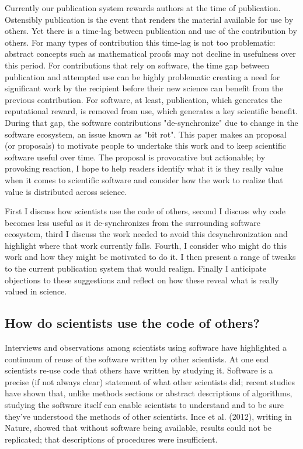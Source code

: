 \documentclass{sigchi}
\begin{document}
Currently our publication system rewards authors at the time of publication. Ostensibly publication is the event that renders the material available for use by others. Yet there is a time-lag between publication and use of the contribution by others. For many types of contribution this time-lag is not too problematic: abstract concepts such as mathematical proofs may not decline in usefulness over this period. For contributions that rely on software, the time gap between publication and attempted use can be highly problematic creating a need for significant work by the recipient before their new science can benefit from the previous contribution. For software, at least, publication, which generates the reputational reward, is removed from use, which generates a key scientific benefit. During that gap, the software contributions "de-synchronize" due to change in the software ecosystem, an issue known as "bit rot". This paper makes an proposal (or proposals) to motivate people to undertake this work and to keep scientific software useful over time. The proposal is provocative but actionable; by provoking reaction, I hope to help readers identify what it is they really value when it comes to scientific software and consider how the work to realize that value is distributed across science.

First I discuss how scientists use the code of others, second I discuss why code becomes less useful as it de-synchronizes from the surrounding software ecosystem, third I discuss the work needed to avoid this desynchronization and highlight where that work currently falls. Fourth, I consider who might do this work and how they might be motivated to do it. I then present a range of tweaks to the current publication system that would realign. Finally I anticipate objections to these suggestions and reflect on how these reveal what is really valued in science.

\subsection{How do scientists use the code of others?}

Interviews and observations among scientists using software have highlighted a continuum of reuse of the software written by other scientists.  At one end scientists re-use code that others have written by studying it. Software is a precise (if not always clear) statement of what other scientists did; recent studies have shown that, unlike methods sections or abstract descriptions of algorithms, studying the software itself can enable scientists to understand and to be sure they've understood the methods of other scientists. Ince et al. (2012), writing in Nature, showed that without software being available, results could not be replicated; that descriptions of procedures were insufficient.
\end{document}
